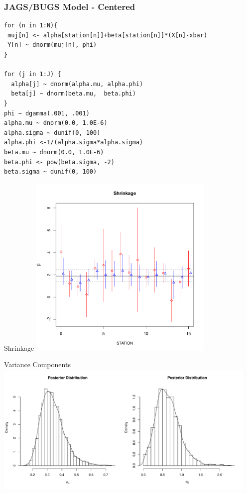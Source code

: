 \documentclass[]{beamer}
\begin{document}
\begin{frame}[fragile]
\frametitle{JAGS/BUGS Model - Centered}
\begin{verbatim}
for (n in 1:N){
 muj[n] <- alpha[station[n]]+beta[station[n]]*(X[n]-xbar)
 Y[n] ~ dnorm(muj[n], phi)
}

for (j in 1:J) {
  alpha[j] ~ dnorm(alpha.mu, alpha.phi)
  beta[j] ~ dnorm(beta.mu,  beta.phi)
}
phi ~ dgamma(.001, .001)
alpha.mu ~ dnorm(0.0, 1.0E-6)
alpha.sigma ~ dunif(0, 100)
alpha.phi <-1/(alpha.sigma*alpha.sigma)
beta.mu ~ dnorm(0.0, 1.0E-6)
beta.phi <- pow(beta.sigma, -2)
beta.sigma ~ dunif(0, 100)
\end{verbatim}
\end{frame}

\begin{frame}{Shrinkage}
       \includegraphics[height=3.5in]{shrinkage}
\end{frame}

\begin{frame}{Variance Components}
\includegraphics[height=2.5in]{varcomp}
\end{frame}
\end{document}
